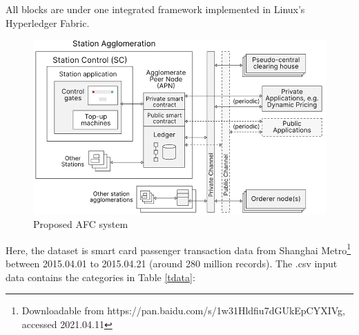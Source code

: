 \documentclass[a4paper,12pt,oneside, utf8x]{report}
\begin{document}
\begin{enumerate}
All blocks are under one integrated framework implemented in Linux’s Hyperledger Fabric. 

    \begin{figure}[H]
        \centering
        \includegraphics[width=.96\textwidth]{figures/3.png}
        \caption{Proposed AFC system}
        \label{f33}
    \end{figure}
    
Here, the dataset is smart card passenger transaction data from Shanghai Metro\footnote{Downloadable from https://pan.baidu.com/s/1w31Hldfiu7dGUkEpCYXIVg, accessed 2021.04.11}  between 2015.04.01 to 2015.04.21 (around 280 million records). The .csv input data contains the categories in Table \ref{tdata}:

\begin{table}[]
\caption{Sample metro data}
\end{table}


\end{enumerate}
\end{document}
